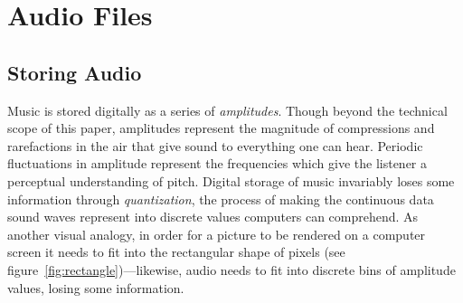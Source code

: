 \section{Audio Files}

\subsection{Storing Audio}

Music is stored digitally as a series of \textit{amplitudes}. Though beyond the technical scope of this paper, amplitudes represent the magnitude of compressions and rarefactions in the air that give sound to everything one can hear. Periodic fluctuations in amplitude represent the frequencies which give the listener a perceptual understanding of pitch. Digital storage of music invariably loses some information through \textit{quantization}, the process of making the continuous data sound waves represent into discrete values computers can comprehend. As another visual analogy, in order for a picture to be rendered on a computer screen it needs to fit into the rectangular shape of pixels (see figure~\ref{fig:rectangle})---likewise, audio needs to fit into discrete bins of amplitude values, losing some information.